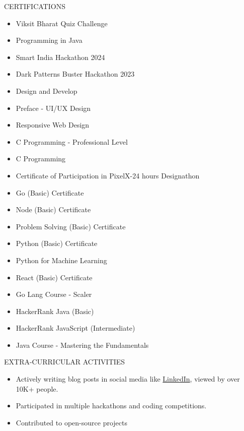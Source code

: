 \documentclass{resume}
\begin{document}

\begin{rSection}{CERTIFICATIONS}

    \begin{itemize}
        \item Viksit Bharat Quiz Challenge
\item Programming in Java
\item Smart India Hackathon 2024
\item Dark Patterns Buster Hackathon 2023
\item Design and Develop
\item Preface - UI/UX Design
\item Responsive Web Design
\item C Programming - Professional Level
\item C Programming
\item Certificate of Participation in PixelX-24 hours Designathon
\item Go (Basic) Certificate
\item Node (Basic) Certificate
\item Problem Solving (Basic) Certificate
\item Python (Basic) Certificate
\item Python for Machine Learning
\item React (Basic) Certificate
\item Go Lang Course - Scaler
\item HackerRank Java (Basic)
\item HackerRank JavaScript (Intermediate)
\item Java Course - Mastering the Fundamentals

    \end{itemize}
    
    \end{rSection}
    


\begin{rSection}{EXTRA-CURRICULAR ACTIVITIES}

    \begin{itemize}
        \item Actively writing blog posts in social media like \href{https://www.linkedin.com/in/rahul-marban}{LinkedIn}, viewed by over 10K+ people.
        \item Participated in multiple hackathons and coding competitions.
        \item Contributed to open-source projects
    \end{itemize}
    
    \end{rSection}
    
    \vspace{1.5em}

    
    
\end{document}
